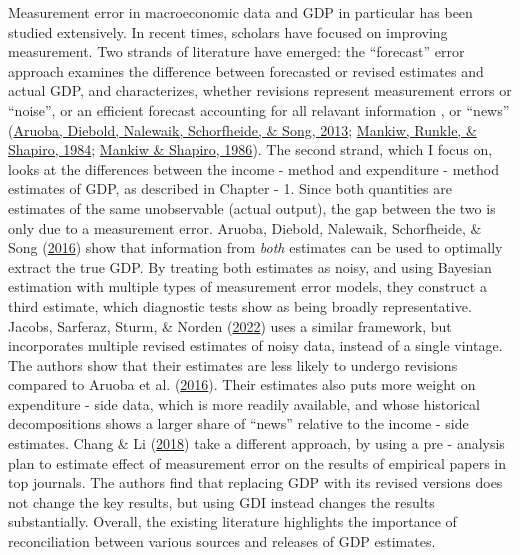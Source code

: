 \documentclass[12pt,nobind, a4paper]{reedthesis}
\begin{document}
 Measurement error in macroeconomic data and GDP in particular has been studied extensively. In recent times, scholars have focused on improving measurement. Two strands of literature have emerged: the ``forecast'' error approach examines the difference between forecasted or revised estimates and actual GDP, and characterizes, whether revisions represent measurement errors or ``noise'', or an efficient forecast accounting for all relavant information , or ``news'' (\protect\hyperlink{ref-aruoba_improving_2013}{Aruoba, Diebold, Nalewaik, Schorfheide, \& Song, 2013}; \protect\hyperlink{ref-mankiw_are_1984}{Mankiw, Runkle, \& Shapiro, 1984}; \protect\hyperlink{ref-mankiw_news_1986}{Mankiw \& Shapiro, 1986}). The second strand, which I focus on, looks at the differences between the income - method and expenditure - method estimates of GDP, as described in Chapter - 1. Since both quantities are estimates of the same unobservable (actual output), the gap between the two is only due to a measurement error. Aruoba, Diebold, Nalewaik, Schorfheide, \& Song (\protect\hyperlink{ref-aruoba_improving_2016}{2016}) show that information from \emph{both} estimates can be used to optimally extract the true GDP. By treating both estimates as noisy, and using Bayesian estimation with multiple types of measurement error models, they construct a third estimate, which diagnostic tests show as being broadly representative. Jacobs, Sarferaz, Sturm, \& Norden (\protect\hyperlink{ref-jacobs_can_2022}{2022}) uses a similar framework, but incorporates multiple revised estimates of noisy data, instead of a single vintage. The authors show that their estimates are less likely to undergo revisions compared to Aruoba et al. (\protect\hyperlink{ref-aruoba_improving_2016}{2016}). Their estimates also puts more weight on expenditure - side data, which is more readily available, and whose historical decompositions shows a larger share of ``news'' relative to the income - side estimates. Chang \& Li (\protect\hyperlink{ref-chang_measurement_2018}{2018}) take a different approach, by using a pre - analysis plan to estimate effect of measurement error on the results of empirical papers in top journals. The authors find that replacing GDP with its revised versions does not change the key results, but using GDI instead changes the results substantially. Overall, the existing literature highlights the importance of reconciliation between various sources and releases of GDP estimates.
 \linebreak
\end{document}
